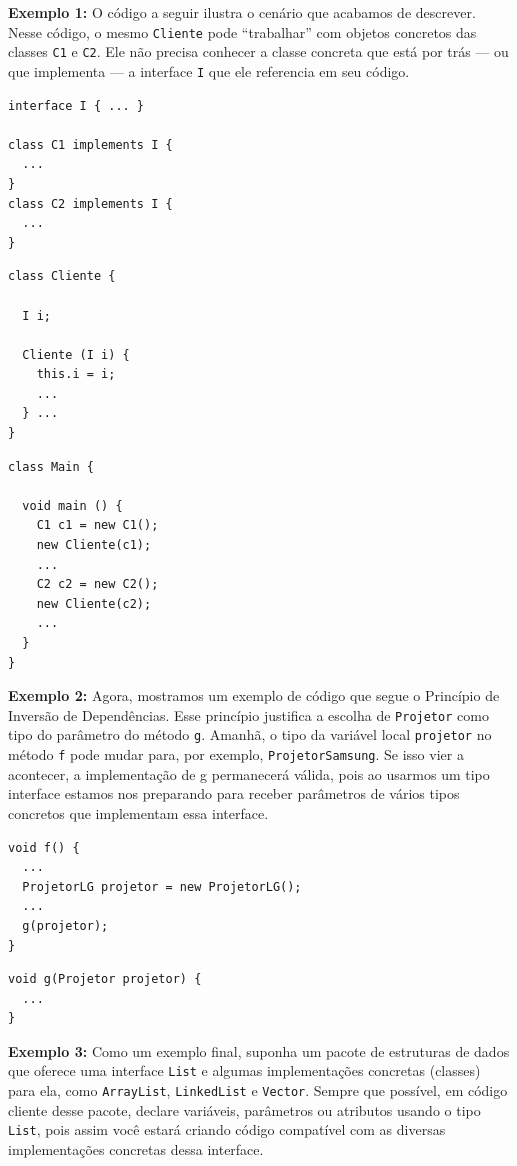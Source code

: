 \documentclass[
  11pt,
  twoside]{book}
\newcommand{\passthrough}[1]{#1}
\begin{document}
\textbf{Exemplo 1:} O código a seguir ilustra o cenário que acabamos de
descrever. Nesse código, o mesmo \passthrough{\lstinline!Cliente!} pode
``trabalhar'' com objetos concretos das classes
\passthrough{\lstinline!C1!} e \passthrough{\lstinline!C2!}. Ele não
precisa conhecer a classe concreta que está por trás --- ou que
implementa --- a interface \passthrough{\lstinline!I!} que ele
referencia em seu código.

\begin{lstlisting}
interface I { ... }

class C1 implements I {
  ...
}
class C2 implements I {
  ...
}
\end{lstlisting}

\begin{lstlisting}
class Cliente {

  I i;

  Cliente (I i) {
    this.i = i;
    ...
  } ...
}
\end{lstlisting}

\begin{lstlisting}
class Main {

  void main () {
    C1 c1 = new C1();
    new Cliente(c1);
    ...
    C2 c2 = new C2();
    new Cliente(c2);
    ...
  }
}
\end{lstlisting}

\textbf{Exemplo 2:} Agora, mostramos um exemplo de código que segue o
Princípio de Inversão de Dependências. Esse princípio justifica a
escolha de \passthrough{\lstinline!Projetor!} como tipo do parâmetro do
método \passthrough{\lstinline!g!}. Amanhã, o tipo da variável local
\passthrough{\lstinline!projetor!} no método \passthrough{\lstinline!f!}
pode mudar para, por exemplo, \passthrough{\lstinline!ProjetorSamsung!}.
Se isso vier a acontecer, a implementação de g permanecerá válida, pois
ao usarmos um tipo interface estamos nos preparando para receber
parâmetros de vários tipos concretos que implementam essa interface.

\begin{lstlisting}
void f() {
  ...
  ProjetorLG projetor = new ProjetorLG();
  ...
  g(projetor);
}
\end{lstlisting}

\begin{lstlisting}
void g(Projetor projetor) {
  ...
}
\end{lstlisting}

\textbf{Exemplo 3:} Como um exemplo final, suponha um pacote de
estruturas de dados que oferece uma interface
\passthrough{\lstinline!List!} e algumas implementações concretas
(classes) para ela, como \passthrough{\lstinline!ArrayList!},
\passthrough{\lstinline!LinkedList!} e \passthrough{\lstinline!Vector!}.
Sempre que possível, em código cliente desse pacote, declare variáveis,
parâmetros ou atributos usando o tipo \passthrough{\lstinline!List!},
pois assim você estará criando código compatível com as diversas
implementações concretas dessa interface.
\end{document}
